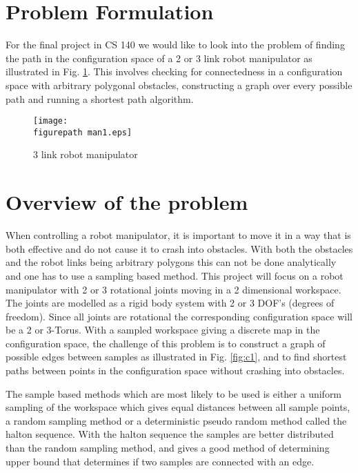 \newcommand{\figurepath}{./figures/}
\newcommand{\figurescale}{0.6}
\newcommand{\codepath}{../matlab/}
\setlength\parindent{24pt}

\section*{Problem Formulation}
For the final project in CS 140 we would like to look into the problem of finding the  path in the configuration space of a 2 or 3 link robot manipulator as illustrated in Fig. \ref{fig:man1}. This involves checking for connectedness in a configuration space with arbitrary polygonal obstacles, constructing a graph over every possible path and running a shortest path algorithm. 


\begin{figure}[h!] 
 \center 
 \texttt{[image: \\figurepath man1.eps]}
 \caption{ 3 link robot manipulator \label{fig:man1}}
 \end{figure}

\section*{Overview of the problem}
When controlling a robot manipulator, it is important to move it in a way that is both effective and do not cause it to crash into obstacles. With both the obstacles and the robot links being arbitrary polygons this can not be done analytically and one has to use a sampling based method. This project will focus on a robot manipulator with 2 or 3 rotational joints moving in a 2 dimensional workspace. The joints are modelled as a rigid body system with 2 or 3 DOF's (degrees of freedom). Since all joints are rotational the corresponding configuration space will be a 2 or 3-Torus. With a sampled workspace giving a discrete map in the configuration space, the challenge of this problem is to construct a graph of possible edges between samples as illustrated in Fig. \ref{fig:c1}, and to find shortest paths between points in the configuration space without crashing into obstacles.  
\\
\par 

The sample based methods which are most likely to be used is either a uniform sampling of the workspace which gives equal distances between all sample points, a random sampling method or a deterministic pseudo random method called the halton sequence. With the halton sequence the samples are better distributed than the random sampling method, and gives a good method of determining upper bound that determines if two samples are connected with an edge. 





